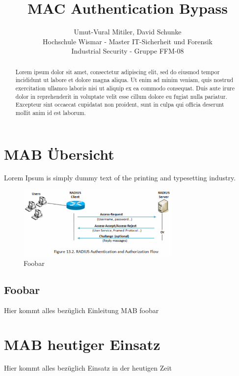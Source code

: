 \documentclass[conference]{IEEEtran}
\begin{document}
\title{MAC Authentication Bypass}
\author{
	Umut-Vural Mitiler, David Schunke\\
	Hochschule Wismar - Master IT-Sicherheit und Forensik\\
	Industrial Security - Gruppe FFM-08
}

\maketitle

\begin{abstract}
Lorem ipsum dolor sit amet, consectetur adipiscing elit, sed do eiusmod tempor incididunt ut labore et dolore magna aliqua. Ut enim ad minim veniam, quis nostrud exercitation ullamco laboris nisi ut aliquip ex ea commodo consequat. Duis aute irure dolor in reprehenderit in voluptate velit esse cillum dolore eu fugiat nulla pariatur. Excepteur sint occaecat cupidatat non proident, sunt in culpa qui officia deserunt mollit anim id est laborum.
\end{abstract}

\section{MAB Übersicht}
Lorem Ipsum \cite{einstein} is simply dummy text of the printing and typesetting industry.

\begin{figure}[hbt]
  \centering
  \includegraphics[width=8cm]{figures/Radius}
  \caption{Foobar \cite{einstein}}
\end{figure}


\subsection{Foobar}
Hier kommt alles bezüglich Einleitung MAB foobar

\section{MAB heutiger Einsatz}
Hier kommt alles bezüglich Einsatz in der heutigen Zeit \cite{Nave:InverseSquareLawSound}
\end{document}

